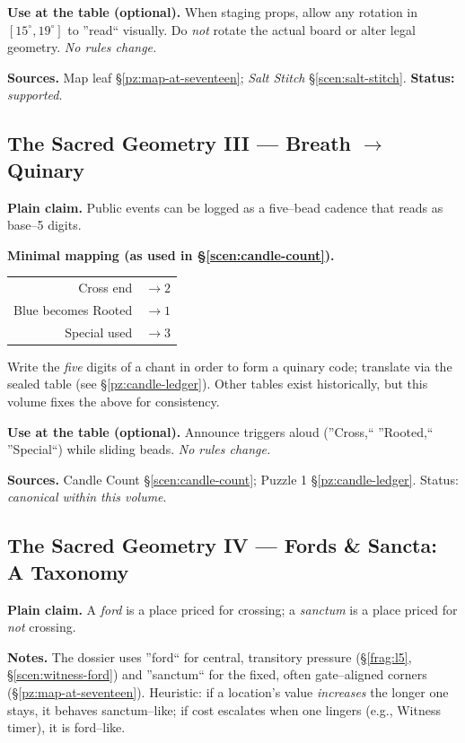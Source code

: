 \documentclass[11pt]{article}
\numberwithin{equation}{section} %
\theoremstyle{plain} %
\theoremstyle{definition} %
\theoremstyle{remark} %
\begin{document}
\medskip
\noindent\textbf{Use at the table (optional).} When staging props, allow any rotation in \([15^\circ,19^\circ]\) to ''read`` visually. Do \emph{not} rotate the actual board or alter legal geometry. \emph{No rules change.}

\medskip
\noindent\textbf{Sources.} Map leaf \S\ref{pz:map-at-seventeen}; \textit{Salt Stitch} \S\ref{scen:salt-stitch}. \textbf{Status:} \emph{supported}.

\subsection{The Sacred Geometry III --- Breath $\rightarrow$ Quinary}
\label{geometry:breath-quinary}

\noindent\textbf{Plain claim.} Public events can be logged as a five--bead cadence that reads as base--5 digits.

\medskip
\noindent\textbf{Minimal mapping (as used in \S\ref{scen:candle-count}).}
\begin{center}
\begin{tabular}{rl}
Cross end & \(\rightarrow 2\) \\
Blue becomes Rooted & \(\rightarrow 1\) \\
Special used & \(\rightarrow 3\)
\end{tabular}
\end{center}
Write the \emph{five} digits of a chant in order to form a quinary code; translate via the sealed table (see \S\ref{pz:candle-ledger}). Other tables exist historically, but this volume fixes the above for consistency.

\medskip
\noindent\textbf{Use at the table (optional).} Announce triggers aloud (''Cross,`` ''Rooted,`` ''Special``) while sliding beads. \emph{No rules change.}

\medskip
\noindent\textbf{Sources.} Candle Count \S\ref{scen:candle-count}; Puzzle 1 \S\ref{pz:candle-ledger}. Status: \emph{canonical within this volume}.


\subsection{The Sacred Geometry IV --- Fords \& Sancta: A Taxonomy}
\label{geometry:ford-vs-sanctum}

\noindent\textbf{Plain claim.} A \emph{ford} is a place priced for crossing; a \emph{sanctum} is a place priced for \emph{not} crossing.

\medskip
\noindent\textbf{Notes.} The dossier uses ''ford`` for central, transitory pressure (\S\ref{frag:l5}, \S\ref{scen:witness-ford}) and ''sanctum`` for the fixed, often gate--aligned corners (\S\ref{pz:map-at-seventeen}). Heuristic: if a location's value \emph{increases} the longer one stays, it behaves sanctum--like; if cost escalates when one lingers (e.g., Witness timer), it is ford--like.
\end{document}
